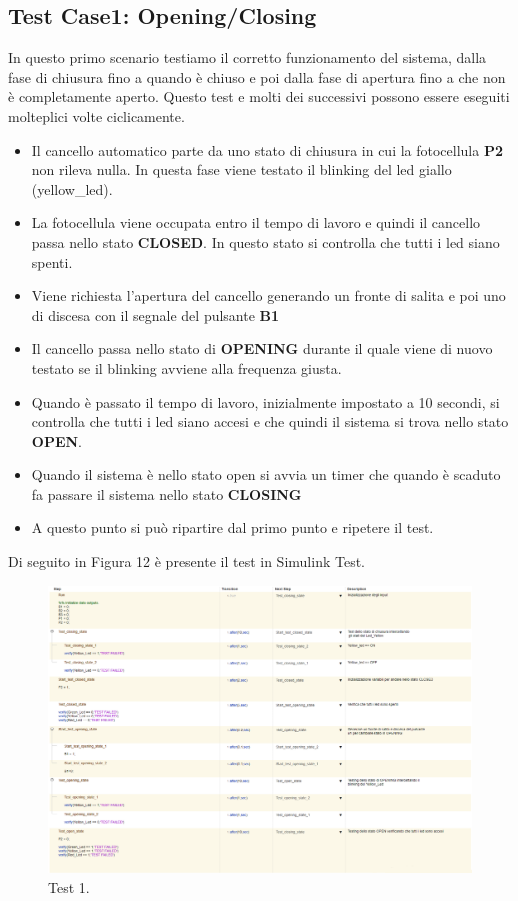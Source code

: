 \documentclass[12pt]{article}
\begin{document}
\subsection{Test Case1: Opening/Closing}
In questo primo scenario testiamo il corretto funzionamento del sistema, dalla fase di chiusura fino a quando è chiuso e poi dalla fase di apertura fino a che non è completamente aperto. Questo test e molti dei successivi possono essere eseguiti molteplici volte ciclicamente.

\begin{itemize}
    \item Il cancello automatico parte da uno stato di chiusura in cui la fotocellula \textbf{P2} non rileva nulla. In questa fase viene testato il blinking del led giallo (yellow\_led).
    \item La fotocellula viene occupata entro il tempo di lavoro e quindi il cancello passa nello stato \textbf{CLOSED}. In questo stato si controlla che tutti i led siano spenti.
    \item Viene richiesta l'apertura del cancello generando un fronte di salita e poi uno di discesa con il segnale del pulsante \textbf{B1}
    \item Il cancello passa nello stato di \textbf{OPENING} durante il quale viene di nuovo testato se il blinking avviene alla frequenza giusta.
    \item Quando è passato il tempo di lavoro, inizialmente impostato a 10 secondi, si controlla che tutti i led siano accesi e che quindi il sistema si trova nello stato \textbf{OPEN}.
    \item Quando il sistema è nello stato open si avvia un timer che quando è scaduto fa passare il sistema nello stato \textbf{CLOSING}
    \item A questo punto si può ripartire dal primo punto e ripetere il test.
\end{itemize}

Di seguito in Figura 12 è presente il test in Simulink Test.

\begin{figure}[H]
    
    \hspace{-2.3cm} %
    \includegraphics[width=1.3\textwidth]{Immagini_Test/Test_1_img.PNG}
    \caption{Test 1.}
    \label{fig:Test_1}
\end{figure}
\newpage
\end{document}
